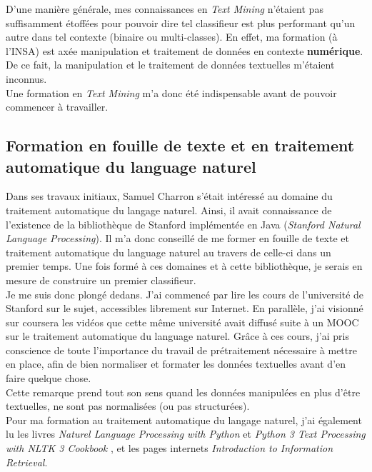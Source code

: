         D'une manière générale, mes connaissances en \textit{Text Mining} n'étaient pas suffisamment étoffées pour pouvoir dire tel classifieur est plus performant qu'un autre dans tel contexte (binaire ou multi-classes). En effet, ma formation (à l'INSA) est axée manipulation et traitement de données en contexte \textbf{numérique}. De ce fait, la manipulation et le traitement de données textuelles m'étaient inconnus.\\

        Une formation en \textit{Text Mining} m'a donc été indispensable avant de pouvoir commencer à travailler.

\color{black}

    \subsection{Formation en fouille de texte et en traitement automatique du language naturel}
        Dans ses travaux initiaux, Samuel Charron s'était intéressé au domaine du traitement automatique du langage naturel. Ainsi, il avait connaissance de l'existence de la bibliothèque de Stanford implémentée en Java (\textit{Stanford Natural Language Processing}). Il m'a donc conseillé de me former en fouille de texte et traitement automatique du language naturel au travers de celle-ci dans un premier temps. Une fois formé à ces domaines et à cette bibliothèque, je serais en mesure de construire un premier classifieur.\\

        Je me suis donc plongé dedans. J'ai commencé par lire les cours de l’université de Stanford sur le sujet, accessibles librement sur Internet. En parallèle, j'ai visionné sur coursera les vidéos que cette même université avait diffusé suite à un MOOC sur le traitement automatique du language naturel. Grâce à ces cours, j'ai pris conscience de toute l'importance du travail de prétraitement nécessaire à mettre en place, afin de bien normaliser et formater les données textuelles avant d'en faire quelque chose.\\

        Cette remarque prend tout son sens quand les données manipulées en plus d'être textuelles, ne sont pas normalisées (ou pas structurées).\\

        Pour ma formation au traitement automatique du langage naturel, j'ai également lu les livres \textit{Naturel Language Processing with Python}\autocite{nlp_p} et \textit{Python 3 Text Processing with NLTK 3 Cookbook}\autocite{nltk} , et les pages internets \textit{Introduction to Information Retrieval}\autocite{ir_web}.


